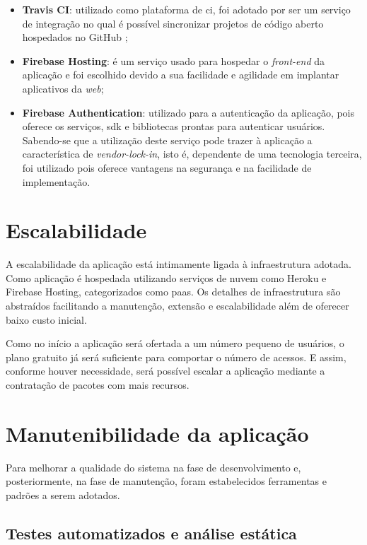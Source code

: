 \documentclass[
    12pt,               %
    openright,          %
    oneside,
    a4paper,            %
    english,            %
    brazil              %
    ]{ifsp-spo-inf-ctds} %
\begin{document}
\begin{itemize}
\item{\textbf{Travis CI}}: utilizado como plataforma de \ac{ci}, foi adotado por ser um serviço de integração no qual é possível sincronizar projetos de código aberto hospedados no GitHub \cite{travis:2021};

\item{\textbf{Firebase Hosting}}: é um serviço usado para hospedar o  \textit{\gls{front-end}} da aplicação e foi escolhido devido a sua facilidade e agilidade em implantar aplicativos da \textit{\gls{web}};

\item{\textbf{Firebase Authentication}}: utilizado para a autenticação da aplicação, pois oferece os serviços, \ac{sdk} e bibliotecas prontas para autenticar usuários. Sabendo-se que a utilização deste serviço pode trazer à aplicação a característica de \textit{\gls{vendor-lock-in}}, isto é, dependente de uma tecnologia terceira, foi utilizado pois oferece vantagens na segurança e na facilidade de implementação.  
\end{itemize}

\section{Escalabilidade}
A escalabilidade da aplicação está intimamente ligada à infraestrutura adotada. Como aplicação é hospedada utilizando serviços de nuvem como Heroku e Firebase Hosting, categorizados como \ac{paas}. Os detalhes de infraestrutura são abstraídos facilitando a manutenção, extensão e escalabilidade além de oferecer baixo custo inicial. 

Como no início a aplicação será ofertada a um número pequeno de usuários, o plano gratuito já será suficiente para comportar o número de acessos. E assim, conforme houver necessidade, será possível escalar a aplicação mediante a contratação de pacotes com mais recursos.

\section{Manutenibilidade da aplicação}
Para melhorar a qualidade do sistema na fase de desenvolvimento e, posteriormente, na fase de manutenção, foram estabelecidos ferramentas e padrões a serem adotados.

\subsection{Testes automatizados e análise estática}
\end{document}
